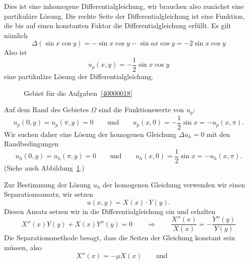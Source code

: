 \begin{loesung}
\begin{teilaufgaben}
\item
Dies ist eine inhomogene Differentialgleichung, wir brauchen also zunächst
eine partikuläre Lösung.
Die rechte Seite der Differentialgleichung ist eine Funktion, die bis auf
einen konstanten Faktor die Differentialgleichung erfüllt.
Es gilt nämlich
\[
\Delta (\sin x\cos y)
=
-\sin x\cos y - \sin ax\cos y
=
-2 \sin x\cos y
\]
Also ist
\[
u_p(x,y)
=
-\frac{1}{2} \sin x\cos y
\]
eine partikuläre Lösung der Differentialgleichung.

\item
\begin{figure}
\centering
{}
\caption{Gebiet für die Aufgaben~\ref{40000018}
\label{40000018:gebiet}}
\end{figure}
Auf dem Rand des Gebietes $\Omega$ sind die Funktionswerte von $u_p$:
\[
u_p(0,y) = u_p(\pi,y)=0
\qquad\text{und}\qquad
u_p(x,0) = -\frac12\sin x = -u_p(x,\pi).
\]
Wir suchen daher eine Lösung der homogenen Gleichung $\Delta u_h = 0$
mit den Randbedingungen
\[
u_h(0,y) = u_h(\pi,y) = 0
\qquad\text{und}\qquad
u_h(x,0) = \frac12\sin x = -u_h(x,\pi).
\]
(Siehe auch Abbildung~\ref{40000018:gebiet}.)
\item
Zur Bestimmung der Lösung $u_h$ der homogenen Gleichung verwenden wir einen
Separationsansatz, wir setzen
\[
u(x,y) = X(x)\cdot Y(y).
\]
Diesen Ansatz setzen wir in die Differentialgleichung ein und erhalten
\[
X''(x)Y(y) + X(x)Y''(y)=0
\qquad\Rightarrow\qquad
\frac{X''(x)}{X(x)} = -\frac{Y''(y)}{Y(y)}
\]
Die Separationsmethode besagt, dass die Seiten der Gleichung konstant
sein müssen, also
\[
X''(x) = -\mu X(x)
\qquad\text{und}\qquad
\]
\end{teilaufgaben}
\end{loesung}

